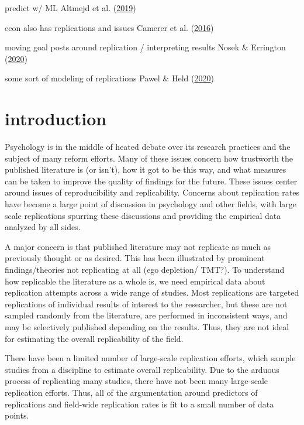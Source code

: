 \documentclass[
  english,
  a4paper,
]{article}
\begin{document}
predict w/ ML Altmejd et al. (\protect\hyperlink{ref-altmejd2019}{2019})

econ also has replications and issues Camerer et al. (\protect\hyperlink{ref-camerer2016}{2016})

moving goal posts around replication / interpreting results Nosek \& Errington (\protect\hyperlink{ref-nosek2020}{2020})

some sort of modeling of replications Pawel \& Held (\protect\hyperlink{ref-pawel2020}{2020})

\hypertarget{introduction}{%
\section{introduction}\label{introduction}}

Psychology is in the middle of heated debate over its research practices and the subject of many reform efforts. Many of these issues concern how trustworth the published literature is (or isn't), how it got to be this way, and what measures can be taken to improve the quality of findings for the future. These issues center around issues of reproducibility and replicability. Concerns about replication rates have become a large point of discussion in psychology and other fields, with large scale replications spurring these discussions and providing the empirical data analyzed by all sides.

A major concern is that published literature may not replicate as much as previously thought or as desired. This has been illustrated by prominent findings/theories not replicating at all (ego depletion/ TMT?). To understand how replicable the literature as a whole is, we need empirical data about replication attempts across a wide range of studies. Most replications are targeted replications of individual results of interest to the researcher, but these are not sampled randomly from the literature, are performed in inconsistent ways, and may be selectively published depending on the results. Thus, they are not ideal for estimating the overall replicability of the field.

There have been a limited number of large-scale replication efforts, which sample studies from a discipline to estimate overall replicability. Due to the arduous process of replicating many studies, there have not been many large-scale replication efforts. Thus, all of the argumentation around predictors of replications and field-wide replication rates is fit to a small number of data points.
\end{document}
